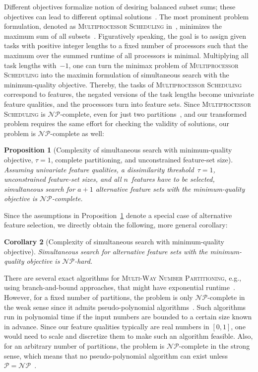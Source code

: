 \documentclass{article}
\newtheorem{corollary}{Corollary} %
\newtheorem{proposition}[corollary]{Proposition} %
\theoremstyle{definition}
\begin{document}
Different objectives formalize notion of desiring balanced subset sums; these objectives can lead to different optimal solutions~\cite{korf2010objective, lawrinenko2017identical}.
The most prominent problem formulation, denoted as \textsc{Multiprocessor Scheduling} in~\cite{garey2003computers}, minimizes the maximum sum of all subsets~\cite{lawrinenko2018reduction, walter2017improved}.
Figuratively speaking, the goal is to assign given tasks with positive integer lengths to a fixed number of processors such that the maximum over the summed runtime of all processors is minimal.
Multiplying all task lengths with~$-1$, one can turn the minimax problem of \textsc{Multiprocessor Scheduling} into the maximin formulation of simultaneous search with the minimum-quality objective.
Thereby, the tasks of \textsc{Multiprocessor Scheduling} correspond to features, the negated versions of the task lengths become univariate feature qualities, and the processors turn into feature sets. 
Since \textsc{Multiprocessor Scheduling} is $\mathcal{NP}$-complete, even for just two partitions~\cite{garey2003computers}, and our transformed problem requires the same effort for checking the validity of solutions, our problem is $\mathcal{NP}$-complete as well:
%
\begin{proposition}[Complexity of simultaneous search with minimum-quality objective, $\tau=1$, complete partitioning, and unconstrained feature-set size]
	Assuming univariate feature qualities, a dissimilarity threshold~$\tau = 1$, unconstrained feature-set sizes, and all $n$~features have to be selected, simultaneous search for $a+1$ alternative feature sets with the minimum-quality objective is $\mathcal{NP}$-complete.
	\label{prop:afs:complexity-partitioning-min-unconstrained-k}
\end{proposition}
%
Since the assumptions in Proposition~\ref{prop:afs:complexity-partitioning-min-unconstrained-k} denote a special case of alternative feature selection, we directly obtain the following, more general corollary:
%
\begin{corollary}[Complexity of simultaneous search with minimum-quality objective]
	Simultaneous search for alternative feature sets with the minimum-quality objective is $\mathcal{NP}$-hard.
\end{corollary}
%
There are several exact algorithms for \textsc{Multi-Way Number Partitioning}, e.g., using branch-and-bound approaches, that might have exponential runtime~\cite{haouari2008maximizing, schreiber2018optimal, walter2017improved}.
However, for a fixed number of partitions, the problem is only $\mathcal{NP}$-complete in the weak sense since it admits pseudo-polynomial algorithms~\cite{garey2003computers, korf2009multi}.
Such algorithms run in polynomial time if the input numbers are bounded to a certain size known in advance.
Since our feature qualities typically are real numbers in $[0,1]$, one would need to scale and discretize them to make such an algorithm feasible.
Also, for an arbitrary number of partitions, the problem is $\mathcal{NP}$-complete in the strong sense, which means that no pseudo-polynomial algorithm can exist unless $\mathcal{P}=\mathcal{NP}$~\cite{garey2003computers}.
\end{document}
